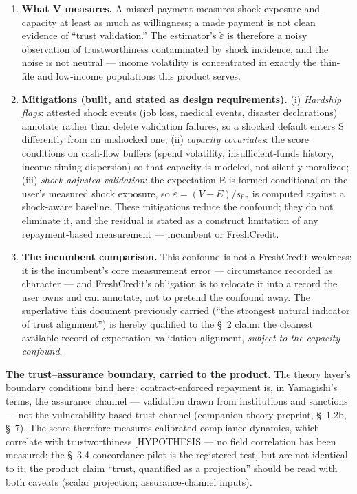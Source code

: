 \documentclass[
]{article}
\begin{document}
\begin{enumerate}
\def\labelenumi{\arabic{enumi}.}
\item
  \textbf{What V measures.} A missed payment measures shock exposure and
  capacity at least as much as willingness; a made payment is not clean
  evidence of ``trust validation.'' The estimator's
  \(\tilde{\varepsilon}\) is therefore a noisy observation of
  trustworthiness contaminated by shock incidence, and the noise is not
  neutral --- income volatility is concentrated in exactly the thin-file
  and low-income populations this product serves.
\item
  \textbf{Mitigations (built, and stated as design requirements).} (i)
  \emph{Hardship flags}: attested shock events (job loss, medical
  events, disaster declarations) annotate rather than delete validation
  failures, so a shocked default enters S differently from an unshocked
  one; (ii) \emph{capacity covariates}: the score conditions on
  cash-flow buffers (spend volatility, insufficient-funds history,
  income-timing dispersion) so that capacity is modeled, not silently
  moralized; (iii) \emph{shock-adjusted validation}: the expectation E
  is formed conditional on the user's measured shock exposure, so
  \(\tilde{\varepsilon} = (V - E)/s_{\mathrm{fin}}\) is computed against
  a shock-aware baseline. These mitigations reduce the confound; they do
  not eliminate it, and the residual is stated as a construct limitation
  of any repayment-based measurement --- incumbent or FreshCredit.
\item
  \textbf{The incumbent comparison.} This confound is not a FreshCredit
  weakness; it is the incumbent's core measurement error ---
  circumstance recorded as character --- and FreshCredit's obligation is
  to relocate it into a record the user owns and can annotate, not to
  pretend the confound away. The superlative this document previously
  carried (``the strongest natural indicator of trust alignment'') is
  hereby qualified to the §~2 claim: the cleanest available record of
  expectation--validation alignment, \emph{subject to the capacity
  confound}.
\end{enumerate}

\textbf{The trust--assurance boundary, carried to the product.} The
theory layer's boundary conditions bind here: contract-enforced
repayment is, in Yamagishi's terms, the assurance channel --- validation
drawn from institutions and sanctions --- not the vulnerability-based
trust channel (companion theory preprint, §~1.2b, §~7). The score
therefore measures calibrated compliance dynamics, which correlate with
trustworthiness {[}HYPOTHESIS --- no field correlation has been
measured; the §~3.4 concordance pilot is the registered test{]} but are
not identical to it; the product claim ``trust, quantified as a
projection'' should be read with both caveats (scalar projection;
assurance-channel inputs).
\end{document}
